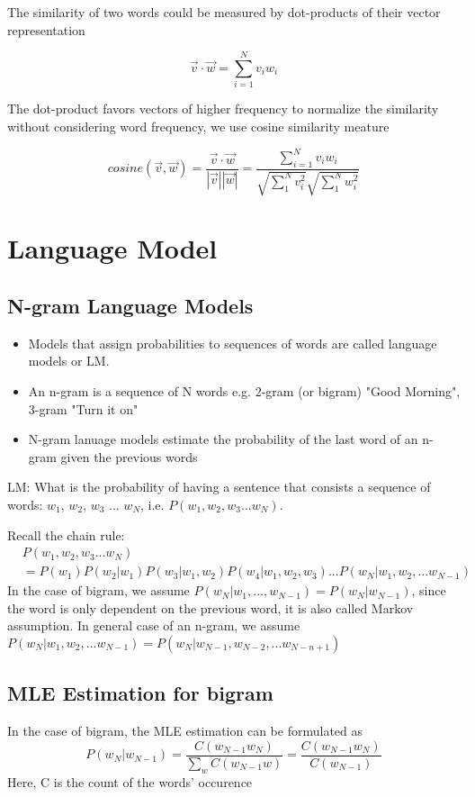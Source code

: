 \documentclass[12pt, oneside]{article}
\begin{document}
The similarity of two words could be measured by dot-products of their vector representation

$$
\vec{v}\cdot\vec{w}=\sum_{i=1}^N v_i w_i
$$

The dot-product favors vectors of higher frequency to normalize the similarity without considering word frequency, we use cosine similarity meature 

$$
cosine(\vec{v}, \vec{w})=\frac{\vec{v}\cdot\vec{w}}{|\vec{v}||\vec{w}|}=\frac{\sum_{i=1}^N v_i w_i}{\sqrt{\sum_1^N v_i^2}\sqrt{\sum_1^N w_i^2}}
$$


\section{Language Model}

\subsection{N-gram Language Models}
\begin{itemize}
\item Models that assign probabilities to sequences of words are called language models or LM.
\item An n-gram is a sequence of N words e.g. 2-gram (or bigram) "Good Morning", 3-gram "Turn it on"
\item N-gram lanuage models estimate the probability of the last word of an n-gram given the previous words
\end{itemize}

LM: What is the probability of having a sentence that consists a sequence of words: $w_1$, $w_2$, $w_3$ ... $w_N$, i.e. $P(w_1, w_2, w_3...w_N)$. 

Recall the chain rule:
\begin{align*}
&P(w_1, w_2, w_3...w_N)\\
&=P(w_1)P(w_2|w_1)P(w_3|w_1, w_2)P(w_4|w_1, w_2, w_3)...P(w_N|w_1, w_2, ...w_{N-1})
\end{align*}
In the case of bigram, we assume $P(w_N|w_1,...,w_{N-1})=P(w_N|w_{N-1})$, since the word is only dependent on the previous word, it is also called Markov assumption.
\vspace{0.2cm}
In general case of an n-gram, we assume $P(w_N|w_1, w_2, ...w_{N-1})=P(w_N|w_{N-1}, w_{N-2}, ...w_{N-n+1})$

\subsection{MLE Estimation for bigram }
In the case of bigram, the MLE estimation can be formulated as 
$$
P(w_N|w_{N-1})=\frac{C(w_{N-1}w_N)}{\sum_{w}C(w_{N-1}w)}=\frac{C(w_{N-1}w_N)}{C(w_{N-1})}
$$
Here, C is the count of the words' occurence
\end{document}
